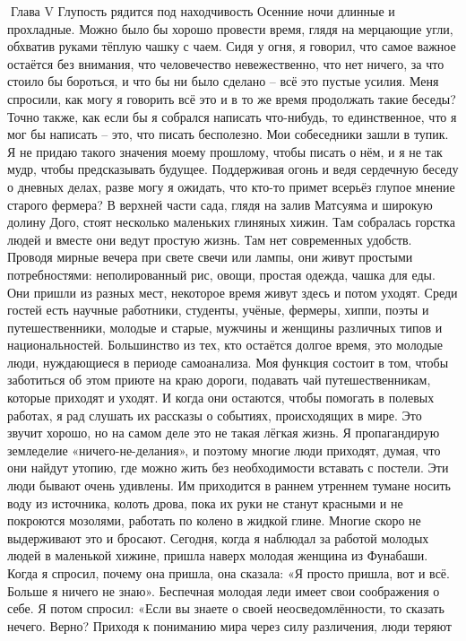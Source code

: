\documentclass[a4paper]{book}
\begin{document}
Глава V Глупость рядится под находчивость
Осенние ночи длинные и прохладные. Можно было бы хорошо провести время, глядя на
мерцающие угли, обхватив руками тёплую чашку с чаем. Сидя у огня, я говорил, что самое
важное остаётся без внимания, что человечество невежественно, что нет ничего, за что
стоило бы бороться, и что бы ни было сделано – всё это пустые усилия. Меня спросили, как
могу я говорить всё это и в то же время продолжать такие беседы? Точно также, как если бы
я собрался написать что-нибудь, то единственное, что я мог бы написать – это, что писать
бесполезно. Мои собеседники зашли в тупик.
Я не придаю такого значения моему прошлому, чтобы писать о нём, и я не так мудр,
чтобы предсказывать будущее. Поддерживая огонь и ведя сердечную беседу о дневных делах,
разве могу я ожидать, что кто-то примет всерьёз глупое мнение старого фермера?
В верхней части сада, глядя на залив Матсуяма и широкую долину Дого, стоят несколько
маленьких глиняных хижин. Там собралась горстка людей и вместе они ведут простую
жизнь. Там нет современных удобств. Проводя мирные вечера при свете свечи или лампы,
они живут простыми потребностями: неполированный рис, овощи, простая одежда, чашка
для еды. Они пришли из разных мест, некоторое время живут здесь и потом уходят.
Среди гостей есть научные работники, студенты, учёные, фермеры, хиппи, поэты и
путешественники, молодые и старые, мужчины и женщины различных типов и
национальностей. Большинство из тех, кто остаётся долгое время, это молодые люди,
нуждающиеся в периоде самоанализа.
Моя функция состоит в том, чтобы заботиться об этом приюте на краю дороги, подавать
чай путешественникам, которые приходят и уходят. И когда они остаются, чтобы помогать в
полевых работах, я рад слушать их рассказы о событиях, происходящих в мире.
Это звучит хорошо, но на самом деле это не такая лёгкая жизнь. Я пропагандирую
земледелие «ничего-не-делания», и поэтому многие люди приходят, думая, что они найдут
утопию, где можно жить без необходимости вставать с постели. Эти люди бывают очень
удивлены. Им приходится в раннем утреннем тумане носить воду из источника, колоть дрова,
пока их руки не станут красными и не покроются мозолями, работать по колено в жидкой
глине. Многие скоро не выдерживают это и бросают.
Сегодня, когда я наблюдал за работой молодых людей в маленькой хижине, пришла
наверх молодая женщина из Фунабаши. Когда я спросил, почему она пришла, она сказала: «Я
просто пришла, вот и всё. Больше я ничего не знаю». Беспечная молодая леди имеет свои
соображения о себе. Я потом спросил: «Если вы знаете о своей неосведомлённости, то
сказать нечего. Верно? Приходя к пониманию мира через силу различения, люди теряют
\end{document}
